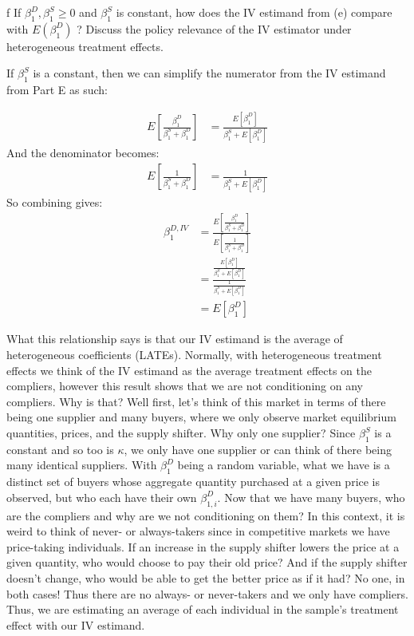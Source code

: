 \documentclass{article}
\begin{document}
\begin{problem}{f}
If $\beta_{1}^{D}, \beta_{1}^{S} \geq 0$ and $\beta_{1}^{S}$ is constant, how does the IV estimand from (e) compare with $E\left(\beta_{1}^{D}\right)$ ? Discuss the policy relevance of the IV estimator under heterogeneous treatment effects.
\end{problem}
\begin{solution}
If $\beta_1^S$ is a constant, then we can simplify the numerator from the IV estimand from Part E as such:

\begin{align*}
    E\left [ \frac{\beta_1^D}{\beta_1^S+\beta_1^D} \right] &=  \frac{E[\beta_1^D]}{\beta_1^S+E[\beta_1^D]}
\end{align*}
And the denominator becomes:
\begin{align*}
    E\left[ \frac{1}{\beta_1^S+\beta_1^D}\right] &=  \frac{1}{\beta_1^S+E[\beta_1^D]}
\end{align*}
So combining gives:
\begin{align*}
    \beta_1^{D,IV} &= \frac{E\left [ \frac{\beta_1^D}{\beta_1^S+\beta_1^D} \right]}{E\left[ \frac{1}{\beta_1^S+\beta_1^D}\right]} \tag{Part E answer} \\
    &=\frac{\frac{E[\beta_1^D]}{\beta_1^S+E[\beta_1^D]}}{\frac{1}{\beta_1^S+E[\beta_1^D]}} \\
    &= E[\beta_1^D]
\end{align*}
\end{solution}
What this relationship says is that our IV estimand is the average of heterogeneous coefficients (LATEs). Normally, with heterogeneous treatment effects we think of the IV estimand as the average treatment effects on the compliers, however this result shows that we are not conditioning on any compliers. Why is that? Well first, let's think of this market in terms of there being one supplier and many buyers, where we only observe market equilibrium quantities, prices, and the supply shifter. Why only one supplier? Since $\beta_1^S$ is a constant and so too is $\kappa$, we only have one supplier or can think of there being many identical suppliers. With $\beta_1^D$ being a random variable, what we have is a distinct set of buyers whose aggregate quantity purchased at a given price is observed, but who each have their own $\beta_{1,i}^D$. Now that we have many buyers, who are the compliers and why are we not conditioning on them? In this context, it is weird to think of never- or always-takers since in competitive markets we have price-taking individuals. If an increase in the supply shifter lowers the price at a given quantity, who would choose to pay their old price? And if the supply shifter doesn't change, who would be able to get the better price as if it had? No one, in both cases! Thus there are no always- or never-takers and we only have compliers. Thus, we are estimating an average of each individual in the sample's treatment effect with our IV estimand.
\end{document}
